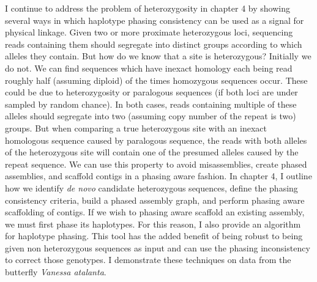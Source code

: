 \par{
I continue to address the problem of heterozygosity in chapter 4 by showing several ways in which haplotype phasing consistency can be used as a signal for physical linkage. Given two or more proximate heterozygous loci, sequencing reads containing them should segregate into distinct groups according to which alleles they contain. But how do we know that a site is heterozygous? Initially we do not. We can find sequences which have inexact homology each being read roughly half (assuming diploid) of the times homozygous sequences occur. These could be due to heterozygosity or paralogous sequences (if both loci are under sampled by random chance). In both cases, reads containing multiple of these alleles should segregate into two (assuming copy number of the repeat is two) groups. But when comparing a true heterozygous site with an inexact homologous sequence caused by paralogous sequence, the reads with both alleles of the heterozygous site will contain one of the presumed alleles caused by the repeat sequence. We can use this property to avoid misassemblies, create phased assemblies, and scaffold contigs in a phasing aware fashion. In chapter 4, I outline how we identify \textit{de novo} candidate heterozygous sequences, define the phasing consistency criteria, build a phased assembly graph, and perform phasing aware scaffolding of contigs. If we wish to phasing aware scaffold an existing assembly, we must first phase its haplotypes. For this reason, I also provide an algorithm for haplotype phasing. This tool has the added benefit of being robust to being given non heterozygous sequences as input and can use the phasing inconsistency to correct those genotypes. I demonstrate these techniques on data from the butterfly \textit{Vanessa atalanta}.
} 

